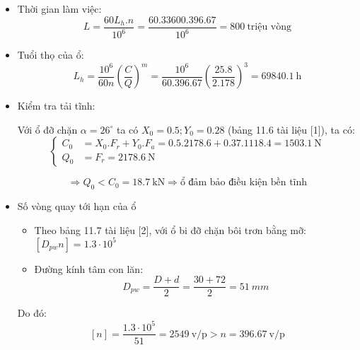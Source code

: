 \begin{itemize}
    \item Thời gian làm việc:
    \[
        L = \frac{60 L_h . n}{10^6} = \frac{60.33600.396.67}{10^6} = 800 \ \text{triệu vòng}
    \]

    \item Tuổi thọ của ổ:
    \[
        L_h = \frac{10^6}{60n} \left( \frac{C}{Q} \right)^m = \frac{10^6}{60.396.67} \left( \frac{25.8}{2.178} \right)^3 = 69840.1 \ \text{h}
    \]

    \item Kiểm tra tải tĩnh:
    
    Với ổ đỡ chặn $\alpha = 26^\circ$ ta có $X_0 = 0.5; Y_0 = 0.28$ (bảng 11.6 tài liệu [1]), ta có:
    \[
        \left\{
        \begin{aligned}
        C_0 &= X_0 . F_r + Y_0 . F_a = 0.5.2178.6 + 0.37.1118.4 = 1503.1 \ \text{N} \\
        Q_0 &= F_r = 2178.6 \ \text{N}
        \end{aligned}
        \right.
    \]

    \[
        \Rightarrow Q_0 < C_0 = 18.7 \ \text{kN} \Rightarrow \text{ổ đảm bảo điều kiện bền tĩnh}
    \]
    
    \item Số vòng quay tới hạn của ổ
    \begin{itemize}
        \item Theo bảng 11.7 tài liệu [2], với ổ bi đỡ chặn bôi trơn bằng mỡ: $[D_{pw}n] = 1.3 \cdot 10^5$
        \item Đường kính tâm con lăn:
        \[
            D_{pw} = \frac{D + d}{2} = \frac{30 + 72}{2} = 51 \ mm
        \]
    \end{itemize}
    
    Do đó:
    \[
        [n] = \frac{1.3 \cdot 10^5}{51} = 2549 \ \text{v/p} > n = 396.67 \ \text{v/p}
    \]
\end{itemize}